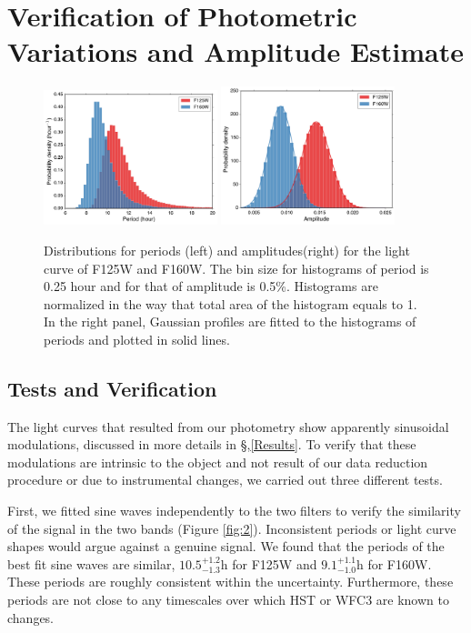 \documentclass[apj]{emulateapj}
\begin{document}
\section{Verification of Photometric Variations and Amplitude
  Estimate}

\begin{figure}
  \centering
  \includegraphics[width=0.45\textwidth]{periodDistr}
  \includegraphics[width=0.45\textwidth]{amplitudeDistr}
  \caption{Distributions for periods (left) and amplitudes(right) for the light
    curve of F125W and F160W. The bin size for histograms of period is
  0.25 hour and for that of amplitude is 0.5\%. Histograms are
  normalized in the way that total area of the histogram equals to
  1. In the right panel, Gaussian profiles are fitted to the
  histograms of periods and plotted in solid lines.}
  \label{fig:4}
\end{figure}

\subsection{Tests and Verification}

The light curves that resulted from our photometry show apparently
sinusoidal modulations, discussed in more details in
\S,\ref{Results}. To verify that these modulations are intrinsic to
the object and not result of our data reduction procedure or due to
instrumental changes, we carried out three different tests.

First, we fitted sine waves independently to the two filters to verify
the similarity of the signal in the two bands (Figure \ref{fig:2}). Inconsistent periods or
light curve shapes would argue against a genuine signal.  We found
that the periods of the best fit sine waves are similar,
$10.5^{+1.2}_{-1.3}$h for F125W and $9.1^{+1.1}_{-1.0}$h for
F160W. These periods are roughly consistent within the
uncertainty. Furthermore, these periods are not close to any
timescales over which HST or WFC3 are known to changes.
\end{document}
